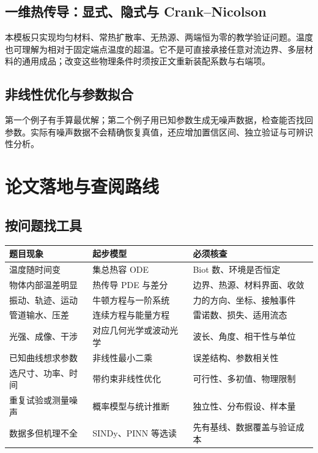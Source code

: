 \section{一维热传导：显式、隐式与 Crank--Nicolson}
本模板只实现均匀材料、常热扩散率、无热源、两端恒为零的教学验证问题。温度也可理解为相对于固定端点温度的超温。它不是可直接承接任意对流边界、多层材料的通用成品；改变这些物理条件时须按正文重新装配系数与右端项。

\section{非线性优化与参数拟合}
第一个例子有手算最优解；第二个例子用已知参数生成无噪声数据，检查能否找回参数。实际有噪声数据不会精确恢复真值，还应增加置信区间、独立验证与可辨识性分析。

\chapter{论文落地与查阅路线}
\section{按问题找工具}
\begin{longtable}{p{}p{}p{}}
\toprule 题目现象 & 起步模型 & 必须核查 \\ \midrule
温度随时间变 & 集总热容 ODE & Biot 数、环境是否恒定 \\
物体内部温差明显 & 热传导 PDE 与差分 & 边界、热源、材料界面、收敛 \\
振动、轨迹、运动 & 牛顿方程与一阶系统 & 力的方向、坐标、接触事件 \\
管道输水、压差 & 连续方程与能量方程 & 雷诺数、损失、适用流态 \\
光强、成像、干涉 & 对应几何光学或波动光学 & 波长、角度、相干性与单位 \\
已知曲线想求参数 & 非线性最小二乘 & 误差结构、参数相关性 \\
选尺寸、功率、时间 & 带约束非线性优化 & 可行性、多初值、物理限制 \\
重复试验或测量噪声 & 概率模型与统计推断 & 独立性、分布假设、样本量 \\
数据多但机理不全 & SINDy、PINN 等选读 & 先有基线、数据覆盖与验证成本 \\
\bottomrule
\end{longtable}

